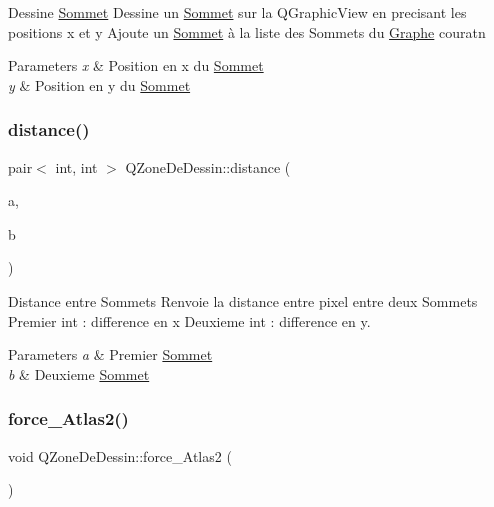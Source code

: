 Dessine \hyperlink{classSommet}{Sommet} Dessine un \hyperlink{classSommet}{Sommet} sur la Q\+Graphic\+View en precisant les positions x et y Ajoute un \hyperlink{classSommet}{Sommet} \`{a} la liste des Sommets du \hyperlink{classGraphe}{Graphe} couratn 
\begin{DoxyParams}{Parameters}
{\em x} & Position en x du \hyperlink{classSommet}{Sommet} \\
\hline
{\em y} & Position en y du \hyperlink{classSommet}{Sommet} \\
\hline
\end{DoxyParams}
\mbox{\label{classQZoneDeDessin_a49a3ae3e70f178cb511b1759e0f27778}} 
\subsubsection{\texorpdfstring{distance()}{distance()}}
{\footnotesize\ttfamily pair$<$ int, int $>$ Q\+Zone\+De\+Dessin\+::distance (\begin{DoxyParamCaption}\item[{\hyperlink{classQSommet}{Q\+Sommet}}]{a,  }\item[{\hyperlink{classQSommet}{Q\+Sommet}}]{b }\end{DoxyParamCaption})}



Distance entre Sommets Renvoie la distance entre pixel entre deux Sommets Premier int \+: difference en x Deuxieme int \+: difference en y. 


\begin{DoxyParams}{Parameters}
{\em a} & Premier \hyperlink{classSommet}{Sommet} \\
\hline
{\em b} & Deuxieme \hyperlink{classSommet}{Sommet} \\
\hline
\end{DoxyParams}
\mbox{\label{classQZoneDeDessin_a2fddc0b3c49fa5eb08cf57a325edad0e}} 
\subsubsection{\texorpdfstring{force\+\_\+\+Atlas2()}{force\_Atlas2()}}
{\footnotesize\ttfamily void Q\+Zone\+De\+Dessin\+::force\+\_\+\+Atlas2 (\begin{DoxyParamCaption}{ }\end{DoxyParamCaption})}



